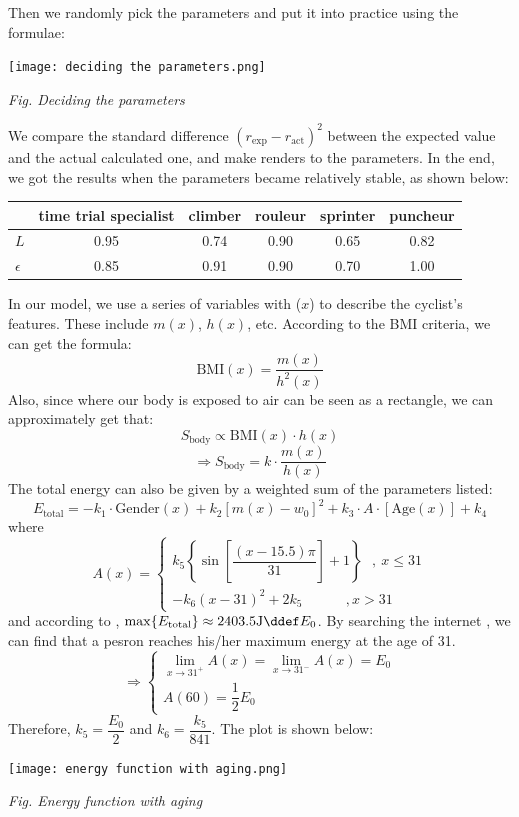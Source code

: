 \documentclass{article}
\begin{document}
			Then we randomly pick the parameters and put it into practice using the formulae:

			\begin{center}
				\texttt{[image: deciding the parameters.png]}

				\small\textit{Fig. Deciding the parameters}
			\end{center}

			We compare the standard difference \(\left( r_{\exp}-r_{\mathrm{act}} \right) ^2\) between the expected value and the actual calculated one, and make renders to the parameters. In the end, we got the results when the parameters became relatively stable, as shown below:

			\begin{center}
				\begin{tabular}{|l||c|c|c|c|c|}
					\hline
					&\textbf{time trial specialist} & \textbf{climber} & \textbf{rouleur} & \textbf{sprinter} & \textbf{puncheur} \\
					\hline
					\hline
					\(L\) & 0.95 & 0.74 & 0.90 & 0.65 & 0.82 \\
					\hline
					\(\epsilon\) & 0.85 & 0.91 & 0.90 & 0.70 & 1.00 \\
					\hline
				\end{tabular}
			\end{center}

			In our model, we use a series of variables with (\(x\)) to describe the cyclist's features. These include $m( x )$, $ h ( x )$, etc. According to the BMI criteria, we can get the formula:
			$$\mathrm{BMI}( x )=\dfrac{m( x )}{ h ^2( x )}$$
			Also, since where our body is exposed to air can be seen as a rectangle, we can approximately get that:
			\[S_{\mathrm{body}} \propto \mathrm{BMI}(x)\cdot h(x)\]
			\[\Rightarrow S_{\mathrm{body}}=k\cdot \dfrac{m(x)}{h(x)}\]
			The total energy can also be given by a weighted sum of the parameters listed:
			\[E_{\mathrm{total}}=-k_1\cdot\mathrm{Gender}(x)+k_2[m(x)-w_0]^2+k_3\cdot A\cdot [\mathrm{Age}(x)]+k_4\]
			where
			\[A(x)=
				\begin{cases}
					k_5\left\{\sin\left[\dfrac{(x-15.5)\pi}{31 }\right]+1\right\}~~~,~x\leq 31 \\
					-k_6 (x-31)^2+2k_5~~~~~~~~~~~~~~,x>31
				\end{cases}
			\]
			and according to \cite{114514}, \(\max\{E_{\mathrm{total}}\}\approx 2403.5 \mathrm{J}\ddef E_{0}\). By searching the internet \cite{energy curve}, we can find that a pesron reaches his/her maximum energy at the age of 31.
			\[
				\Rightarrow
				\begin{cases}
					\lim\limits_{x\rightarrow 31^+} A\left( x \right) =\lim\limits_{x\rightarrow 31^-} A\left( x \right)=E_0 \\
					A(60)=\dfrac 12 E_0
				\end{cases}
			\]
			Therefore, \(k_5 = \dfrac{E_0}{2}\) and \(k_6=\dfrac{k_5}{841}\). The plot is shown below:
			\begin{center}
				\texttt{[image: energy function with aging.png]}

				\small\textit{Fig. Energy function with aging}
			\end{center}
\end{document}
